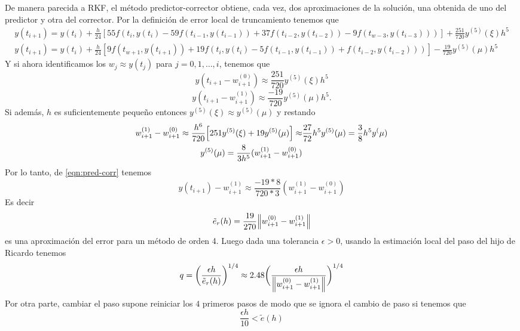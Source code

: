 De manera parecida a RKF, %
el método predictor-corrector obtiene, cada vez,
dos aproximaciones de la solución,
una obtenida de uno del predictor y otra del corrector.
Por la definición de error local de truncamiento tenemos que
\begin{gather*}
    y(t_{i+1}) = y(t_i) + \frac{h}{24}[
        55f(t_i,y(t_i) - 59f(t_{i-1},y(t_{i-1})) + 37f(t_{i-2}, y(t_{i-2}))
        - 9f(t_{w-3},y(t_{i-3})))
    ] + \frac{251}{720}y^{(5)}(\xi)h^5  \\
    y(t_{i+1}) = y(t_i) + \frac{h}{24}[
        9f(t_{w+1},y(t_{i+1})) + 19f(t_i,y(t_i) - 5f(t_{i-1},y(t_{i-1}))
        + f(t_{i-2}, y(t_{i-2})))
    ] - \frac{19}{720}y^{(5)}(\mu)h^5
\end{gather*}
Y si ahora identificamos los $w_j \approx y(t_j)$ para $j = 0,1,\dots, i$,
tenemos que
\begin{equation*} 
    y(t_{i+1} - w_{i+1}^{(0)}) \approx {} 
        \frac{251}{720}y^{(5)}(\xi)h^5
\end{equation*}
\begin{equation} \label{eqn:pred-corr}
    y(t_{i+1} - w_{i+1}^{(1)}) \approx {} 
        \frac{-19}{720}y^{(5)}(\mu)h^5.
\end{equation}
Si además, $h$ es suficientemente pequeño entonces
$y^{(5)}(\xi) \approx y^{(5)}(\mu)$
y restando
\begin{align*}
    w_{i+1}^{(1)} - w_{i+1}^{(0)} \approx 
        \frac{h^6}{720}\qty[251y^{(5)}(\xi) + 19y^{(5)}(\mu)] \approx &
        \frac{27}{72}h^5y^{(5)}(\mu) = \frac{3}{8}h^5y^(\mu) \\
    y^{(5)}(\mu) = \frac{8}{3h^5}(w_{i+1}^{(1)} - w_{i+1}^{(0)}) &
\end{align*}
Por lo tanto, de \ref{eqn:pred-corr} tenemos
\begin{equation*}
    y(t_{i+1}) - w_{i+1}^{(1)} \approx \frac{-19 * 8}{720 * 3}(w_{i+1}^{(1)} - w_{i+1}^{(0)})
\end{equation*}
Es decir
\begin{equation*}
    \tilde{e}_r(h) = \frac{19}{270}\norm{w_{i+1}^{(0)} - w_{i+1}^{(1)}}   
\end{equation*}
es una aproximación del error para un método de orden 4.
Luego dada una tolerancia $\epsilon > 0$, usando la estimación
local del paso del hijo de Ricardo tenemos
\begin{equation*}
    q = \bigg(\frac{\epsilon h}{\tilde{e}_r(h)}\bigg)^{1/4} \approx 
        2.48\bigg(\frac{\epsilon h}{\norm{w_{i+1}^{(0)} - w_{i+1}^{(1)}}}\bigg)^{1/4}
\end{equation*}
Por otra parte, cambiar el paso supone reiniciar los
$4$ primeros pasos de modo que se ignora el cambio de paso 
si tenemos que 
\begin{equation*}
    \frac{\epsilon h}{10} < \tilde{e}(h)
\end{equation*}

